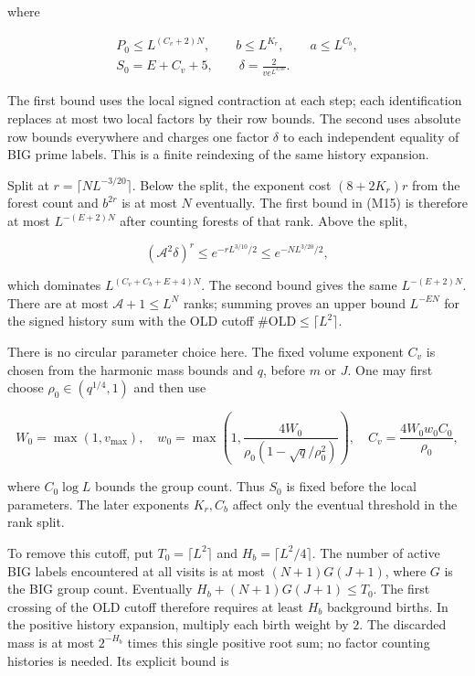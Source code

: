 where

\[
\begin{gathered}
P_0\le L^{(C_v+2)N},\qquad b\le L^{K_r},\qquad a\le L^{C_b},\\
S_0=E+C_v+5,\qquad \delta=\frac2{v e^{L^{3/10}}}.
\end{gathered}
\]

The first bound uses the local signed contraction at each step; each
identification replaces at most two local factors by their row bounds.
The second uses absolute row bounds everywhere and charges one factor
\(\delta\) to each independent equality of BIG prime labels. This is a
finite reindexing of the same history expansion.

Split at \(r=\lceil NL^{-3/20}\rceil\). Below the split, the exponent
cost \((8+2K_r)r\) from the forest count and \(b^{2r}\) is at most \(N\)
eventually. The first bound in (M15) is therefore at most
\(L^{-(E+2)N}\) after counting forests of that rank. Above the split,

\[
(\mathcal A^2\delta)^r
 \le e^{-rL^{3/10}/2}
 \le e^{-NL^{3/20}/2},
\]

which dominates \(L^{(C_v+C_b+E+4)N}\). The second bound gives the same
\(L^{-(E+2)N}\). There are at most \(\mathcal A+1\le L^N\) ranks;
summing proves an upper bound \(L^{-EN}\) for the signed history sum
with the OLD cutoff \(\#\mathrm{OLD}\le\lceil L^2\rceil\).

There is no circular parameter choice here. The fixed volume exponent
\(C_v\) is chosen from the harmonic mass bounds and \(q\), before \(m\)
or \(J\). One may first choose \(\rho_0\in(q^{1/4},1)\) and then use

\[
W_0=\max(1,v_{\max}),\quad
w_0=\max\!\left(1,\frac{4W_0}{\rho_0(1-\sqrt q/\rho_0^2)}\right),
\quad C_v=\frac{4W_0w_0C_0}{\rho_0},
\]

where \(C_0\log L\) bounds the group count. Thus \(S_0\) is fixed before
the local parameters. The later exponents \(K_r,C_b\) affect only the
eventual threshold in the rank split.

To remove this cutoff, put \(T_0=\lceil L^2\rceil\) and
\(H_b=\lceil L^2/4\rceil\). The number of active BIG labels encountered
at all visits is at most \((N+1)G(J+1)\), where \(G\) is the BIG group
count. Eventually \(H_b+(N+1)G(J+1)\le T_0\). The first crossing of the
OLD cutoff therefore requires at least \(H_b\) background births. In the
positive history expansion, multiply each birth weight by \(2\). The
discarded mass is at most \(2^{-H_b}\) times this single positive root
sum; no factor counting histories is needed. Its explicit bound is

